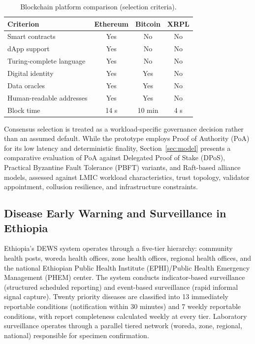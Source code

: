 \documentclass[AMA,LATO1COL]{WileyNJD-v2}
\begin{document}
\begin{table}[!ht]
\caption{Blockchain platform comparison (selection criteria).}\label{tab:platform}
\begin{tabular*}{\columnwidth}{@{\extracolsep\fill}lccc@{}}
\toprule
Criterion & Ethereum & Bitcoin & XRPL \\
\midrule
Smart contracts & Yes & No & No \\
dApp support & Yes & No & No \\
Turing-complete language & Yes & No & No \\
Digital identity & Yes & Yes & No \\
Data oracles & Yes & Yes & No \\
Human-readable addresses & Yes & Yes & No \\
Block time & 14 s & 10 min & 4 s \\
\bottomrule
\end{tabular*}
\end{table}

Consensus selection is treated as a workload-specific governance decision rather than an assumed default. While the prototype employs Proof of Authority (PoA) for its low latency and deterministic finality, Section~\ref{sec:model} presents a comparative evaluation of PoA against Delegated Proof of Stake (DPoS), Practical Byzantine Fault Tolerance (PBFT) variants, and Raft-based alliance models, assessed against LMIC workload characteristics, trust topology, validator appointment, collusion resilience, and infrastructure constraints.

\subsection{Disease Early Warning and Surveillance in Ethiopia}\label{subsec:dews}

Ethiopia's DEWS system operates through a five-tier hierarchy: community health posts, woreda health offices, zone health offices, regional health offices, and the national Ethiopian Public Health Institute (EPHI)/Public Health Emergency Management (PHEM) center. The system conducts indicator-based surveillance (structured scheduled reporting) and event-based surveillance (rapid informal signal capture). Twenty priority diseases are classified into 13 immediately reportable conditions (notification within 30 minutes) and 7 weekly reportable conditions, with report completeness calculated weekly at every tier. Laboratory surveillance operates through a parallel tiered network (woreda, zone, regional, national) responsible for specimen confirmation.
\end{document}
